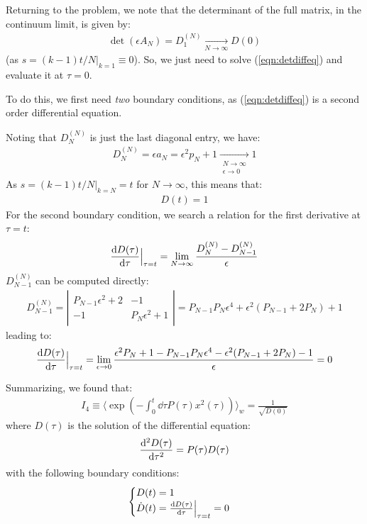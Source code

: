 \documentclass[../template.tex]{subfiles}
\begin{document}
Returning to the problem, we note that the determinant of the full matrix, in the continuum limit, is given by:
\begin{align*}
    \operatorname{det}(\epsilon A_N) = D_1^{(N)}  \xrightarrow[N \to \infty]{}  D(0) 
\end{align*}
(as $s = (k-1)t/N \Big|_{k=1} \equiv 0$). So, we just need to solve (\ref{eqn:detdiffeq}) and evaluate it at $\tau = 0$. 

To do this, we first need \textit{two} boundary conditions, as (\ref{eqn:detdiffeq}) is a second order differential equation. 

Noting that $D_N^{(N)}$ is just the last diagonal entry, we have:
\begin{align*}
    D_N^{(N)} = \epsilon a_N = \epsilon^2 p_N + 1  \xrightarrow[\substack{N \to \infty\\ \epsilon \to 0}]{} 1 
\end{align*}  
As $s = (k-1)t/N \big|_{k=N} = t$ for $N \to \infty$, this means that:
\begin{align*}
    D(t) = 1
\end{align*}
For the second boundary condition, we search a relation for the first derivative at $\tau = t$:
\begin{align*}
    \dv{D(\tau)}{\tau} \Big|_{\tau = t} = \lim_{N \to \infty} \frac{D_N^{(N)} - D_{N-1}^{(N)}}{\epsilon} 
\end{align*}   
$D^{(N)}_{N-1}$ can be computed directly:
\begin{align*}
    D_{N-1}^{(N)} = \left|\begin{array}{cc}
    P_{N-1} \epsilon^2 +2 & -1 \\ 
    -1 & P_N \epsilon^2 + 1
    \end{array}\right| = P_{N-1} P_N \epsilon^4 + \epsilon^2(P_{N-1}+ 2P_N) + 1 
\end{align*} 
leading to:
\begin{align*}
    \dv{D(\tau)}{\tau}\Big|_{\tau=t} = \lim_{\epsilon \to 0} \frac{\epsilon^2 P_N + 1 - P_{N-1}P_N \epsilon^4 - \epsilon^2(P_{N-1} + 2 P_N)-1}{\epsilon}  = 0
\end{align*}

Summarizing, we found that:
\begin{align*}
    I_4 \equiv \langle \exp\left(-\int_0^t \dd{\tau} P(\tau) x^2(\tau) \right)\rangle_w = \frac{1}{\sqrt{D(0)}} 
\end{align*}
where $D(\tau)$ is the solution of the differential equation:
\begin{align*}
    \dv[2]{D(\tau)}{\tau} = P(\tau) D(\tau)
\end{align*}  
with the following boundary conditions:
\begin{align*}
    \begin{cases}
        D(t) = 1\\
        \dot{D}(t) = \dv{D(\tau)}{\tau}\Big|_{\tau = t} = 0
    \end{cases}
\end{align*}
\end{document}
